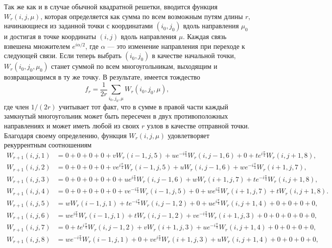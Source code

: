 \documentclass[utf8,12pt]{jetp}
\begin{document}
Так же как и в случае обычной квадратной решетки, вводится функция $W_r(i, j, \mu)$, которая определяется как сумма по всем возможным путям длины $r$, начинающиеся из заданной точки с координатами $(i_0, j_0)$ вдоль направления $\mu_0$ и достигая в точке координаты $(i, j)$ вдоль направления $\mu$. Каждая связь взвешена множителем $e^{i \alpha/2}$, где $\alpha$ --- это изменение направления при переходе к следующей связи. Если теперь выбрать $(i_0, j_0)$ в качестве начальной точки, $W_r(i_0, j_0, \mu_0)$ станет суммой по всем многоугольникам, выходящим и возвращающимся в ту же точку. В результате, имеется тождество
\begin{equation}
	f_r = \frac{1}{2r}\sum_{i_0, j_0, \mu} W_r (i_0, j_0, \mu),
	\label{fr}
\end{equation}
где член $1/(2r)$ учитывает тот факт, что в сумме в правой части каждый замкнутый многоугольник может быть пересечен в двух противоположных направлениях и может иметь любой из своих $r$ узлов в качестве отправной точки. Благодаря своему определению, функция $W_r(i, j, \mu)$ удовлетворяет рекуррентным соотношениям
\begin{align}
	W_{r+1} (i, j, 1) &= 0 + 0 + 0 + 0 + v W_r(i-1,j,5) + u e^{-i\frac{\pi}{4}} W_r(i,j-1,6) + 0 + t e^{i\frac{\pi}{4}} W_r(i,j+1,8),\nonumber\\
	W_{r+1} (i, j, 2) &= 0 + 0 + 0 + 0 + v e^{i\frac{\pi}{4}}W_r(i-1,j,5) + u W_r(i,j-1,6) + w e^{-i\frac{\pi}{4}} W_r(i+1,j,7),\nonumber\\
	W_{r+1} (i, j, 3) &= 0 + 0 + 0 + 0 + 0 + u e^{i\frac{\pi}{4}} W_r(i,j-1,6) + w W_r(i+1,j,7) + t e^{-i\frac{\pi}{4}} W_r(i,j+1,8),\nonumber\\
	W_{r+1} (i, j, 4) &= 0 + 0 + 0 + 0 + 0 + v e^{-i\frac{\pi}{4}} W_r(i-1,j,5) + 0 + w e^{i\frac{\pi}{4}} W_r(i+1,j,7) + t W_r(i,j+1,8).\nonumber\\
	W_{r+1} (i, j, 5) &= w W_r(i-1,j,1) + t e^{-i\frac{\pi}{4}} W_r(i,j-1,2) + 0 + u e^{i\frac{\pi}{4}} W_r(i,j+1,4) + 0 + 0 + 0 + 0, \nonumber\\
	W_{r+1} (i, j, 6) &= w e^{i\frac{\pi}{4}}W_r(i-1,j,1) + t W_r(i,j-1,2) + v e^{-i\frac{\pi}{4}} W_r(i+1,j,3) + 0 + 0 + 0 + 0 + 0,\nonumber\\
	W_{r+1} (i, j, 7) &= 0 + t e^{i\frac{\pi}{4}} W_r(i,j-1,2) + v W_r(i+1,j,3) + u e^{-i\frac{\pi}{4}} W_r(i,j+1,4) + 0 + 0 + 0 + 0,\nonumber\\
	W_{r+1} (i, j, 8) &= w e^{-i\frac{\pi}{4}} W_r(i-1,j,1) + 0 + v e^{i\frac{\pi}{4}} W_r(i+1,j,3) + u W_r(i,j+1,4) + 0 + 0 + 0 + 0,\nonumber\\
	\label{reccursiveW}
\end{align}
\end{document}
